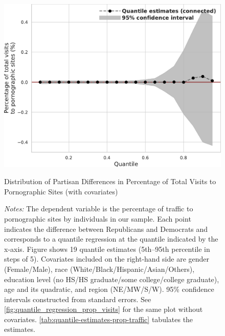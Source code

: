 \documentclass[12pt,twoside]{article}
\begin{document}
\begin{figure}
	\centering
	\includegraphics[width=.6\linewidth]{figs/quantile_reg_covariates_proportion_visits_adult.pdf}
	\caption{Distribution of Partisan Differences in Percentage of Total Visits to Pornographic Sites (with covariates)}
	\caption*{\footnotesize \emph{Notes:} 
		The dependent variable is the percentage of traffic to pornographic sites by individuals in our sample.
		Each point indicates the difference between Republicans and Democrats and corresponds to a quantile regression at the quantile indicated by the x-axis.
  Figure shows 19 quantile estimates (5th--95th percentile in steps of 5).
		Covariates included on the right-hand side are gender (Female/Male), race (White/Black/Hispanic/Asian/Others), education level (no HS/HS graduate/some college/college graduate), age and its quadratic, and region (NE/MW/S/W).
		95\% confidence intervals constructed from standard errors.
		See \cref{fig:quantile_regression_prop_visits} for the same plot without covariates.
            \cref{tab:quantile-estimates-prop-traffic} tabulates the estimates.
	}
	\label{fig:quantile_regression_prop_visits_covariates}
\end{figure}
\end{document}

